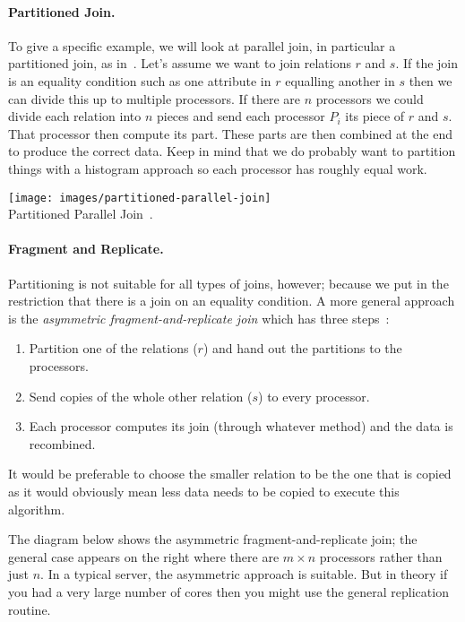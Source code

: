 \documentclass[a4paper]{report}
\begin{document}
\paragraph{Partitioned Join. }To give a specific example, we will look at parallel join, in particular a partitioned join, as in~\cite{dsc}. Let's assume we want to join relations $r$ and $s$. If the join is an equality condition such as one attribute in $r$ equalling another in $s$ then we can divide this up to multiple processors. If there are $n$ processors we could divide each relation into $n$ pieces and send each processor $P_{i}$ its piece of $r$ and $s$. That processor then compute its part. These parts are then combined at the end to produce the correct data. Keep in mind that we do probably want to partition things with a histogram approach so each processor has roughly equal work.

\begin{center}
\texttt{[image: images/partitioned-parallel-join]}\\
Partitioned Parallel Join~\cite{dsc}.
\end{center}

\paragraph{Fragment and Replicate.} Partitioning is not suitable for all types of joins, however; because we put in the restriction that there is a join on an equality condition. A more general approach is the \textit{asymmetric fragment-and-replicate join} which has three steps~\cite{dsc}:

\begin{enumerate}
\item Partition one of the relations ($r$) and hand out the partitions to the processors.
\item Send copies of the whole other relation ($s$) to every processor.
\item Each processor computes its join (through whatever method) and the data is recombined. 
\end{enumerate}

It would be preferable to choose the smaller relation to be the one that is copied as it would obviously mean less data needs to be copied to execute this algorithm.

The diagram below shows the asymmetric fragment-and-replicate join; the general case appears on the right where there are $m \times n$ processors rather than just $n$. In a typical server, the asymmetric approach is suitable. But in theory if you had a very large number of cores then you might use the general replication routine. 
\end{document}
